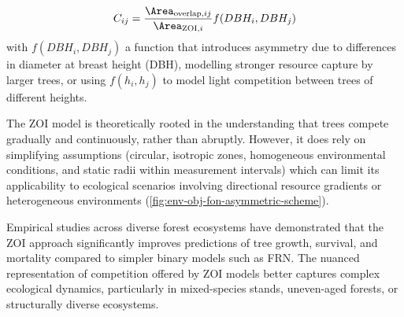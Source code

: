 \begin{align}
C_{ij} = \frac{ \Area_{\text{overlap}, ij} }{ \Area_{\text{ZOI}, i} } f(DBH_i, DBH_j)
\end{align}
with $f(DBH_i, DBH_j)$ a function that introduces asymmetry due to differences in diameter at breast height (DBH), modelling stronger resource capture by larger trees, or using $f(h_i, h_j)$ to model light competition between trees of different heights.

The ZOI model is theoretically rooted in the understanding that trees compete gradually and continuously, rather than abruptly. However, it does rely on simplifying assumptions (circular, isotropic zones, homogeneous environmental conditions, and static radii within measurement intervals) which can limit its applicability to ecological scenarios involving directional resource gradients or heterogeneous environments (\cref{fig:env-obj-fon-asymmetric-scheme}).

Empirical studies across diverse forest ecosystems have demonstrated that the ZOI approach significantly improves predictions of tree growth, survival, and mortality compared to simpler binary models such as FRN. The nuanced representation of competition offered by ZOI models better captures complex ecological dynamics, particularly in mixed-species stands, uneven-aged forests, or structurally diverse ecosystems.


